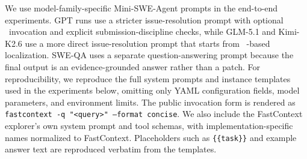 \documentclass{llmxive}
\providecommand{\approach}{~}
\begin{document}
We use model-family-specific Mini-SWE-Agent prompts in the end-to-end experiments.
GPT runs use a stricter issue-resolution prompt with optional \approach invocation and explicit submission-discipline checks, while GLM-5.1 and Kimi-K2.6 use a more direct issue-resolution prompt that starts from \approach-based localization.
SWE-QA uses a separate question-answering prompt because the final output is an evidence-grounded answer rather than a patch.
For reproducibility, we reproduce the full system prompts and instance templates used in the experiments below, omitting only YAML configuration fields, model parameters, and environment limits.
The public invocation form is rendered as \texttt{fastcontext -q "<query>" --format concise}.
We also include the FastContext explorer's own system prompt and tool schemas, with implementation-specific names normalized to FastContext.
Placeholders such as \texttt{\{\{task\}\}} and example answer text are reproduced verbatim from the templates.
\end{document}
